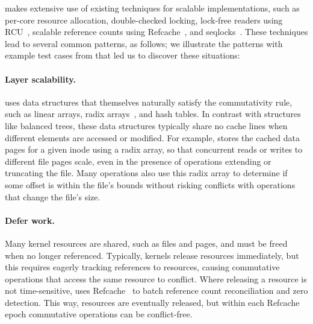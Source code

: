 \fs makes extensive use of existing techniques for scalable
implementations, such as per-core resource
allocation, double-checked locking, lock-free readers using
RCU~\cite{rcu:linux},
scalable reference counts using Refcache~\cite{clements:radixvm},
and seqlocks~\cite[\S6]{lameter:linuxsync}.  These techniques lead to
several common patterns, as follows; we illustrate the patterns with
example test cases from \tool{} that led us to discover these situations:


\paragraph{Layer scalability.}  \fs uses data structures that
themselves naturally satisfy the commutativity rule, such as linear
arrays, radix arrays~\cite{clements:radixvm}, and hash tables.  In
contrast with structures like balanced trees, these data
structures
typically share no cache lines when different elements are accessed
or modified.  For example, \fs stores the cached data pages for a given inode
using a radix array, so that concurrent reads or writes to different
file pages scale, even in the presence of operations
extending or truncating the file.
Many operations also use this radix array to determine if some offset
is within the file's bounds without risking conflicts with operations
that change the file's size.



\paragraph{Defer work.} Many kernel resources are shared,
such as files and pages, and must be freed when no longer referenced.
Typically, kernels release resources immediately, but this requires
eagerly tracking references to resources, causing
commutative operations that access the same resource to conflict.  Where
releasing a resource is not time-sensitive, \fs
uses Refcache~\cite{clements:radixvm} to batch reference count
reconciliation and zero detection.  This way, resources are eventually
released, but within each Refcache epoch commutative operations can be
conflict-free.



